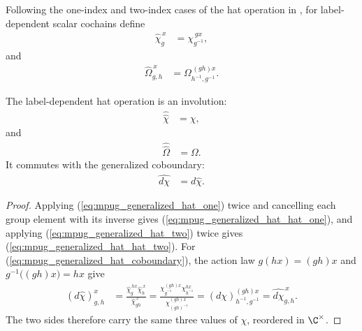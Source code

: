 \begin{definition}
    \label{def:mpug_generalized_hat}
    \leanok
    Following the one-index and two-index cases of the hat operation in
    \cite[line~5912]{FrancoRubio2025MPUGauging}, for label-dependent scalar
    cochains define
    \begin{align}
        \widehat\chi^{\,x}_g
         & =\chi^{\,g x}_{g^{-1}},
        \label{eq:mpug_generalized_hat_one}
    \end{align}
    and
    \begin{align}
        \widehat\Omega^{\,x}_{g,h}
         & =\Omega^{\,(gh)x}_{h^{-1},g^{-1}}.
        \label{eq:mpug_generalized_hat_two}
    \end{align}
\end{definition}

\begin{lemma}
    \label{thm:mpug_generalized_hat_coboundary}
    \leanok
    The label-dependent hat operation is an involution:
    \begin{align}
        \widehat{\widehat\chi} & =\chi,
        \label{eq:mpug_generalized_hat_hat_one}
    \end{align}
    and
    \begin{align}
        \widehat{\widehat\Omega} & =\Omega.
        \label{eq:mpug_generalized_hat_hat_two}
    \end{align}
    It commutes with the generalized coboundary:
    \begin{align}
        \widehat{d\chi} & =d\widehat\chi.
        \label{eq:mpug_generalized_hat_coboundary}
    \end{align}
\end{lemma}

\begin{proof}\leanok
    Applying (\ref{eq:mpug_generalized_hat_one}) twice and cancelling each
    group element with its inverse gives
    (\ref{eq:mpug_generalized_hat_hat_one}), and applying
    (\ref{eq:mpug_generalized_hat_two}) twice gives
    (\ref{eq:mpug_generalized_hat_hat_two}). For
    (\ref{eq:mpug_generalized_hat_coboundary}), the action law
    $g(h x)=(gh)x$ and $g^{-1}\bigl((gh)x\bigr)=h x$ give
    \begin{align}
        (d\widehat\chi)^x_{g,h}
         & =\frac{\widehat\chi^{\,h x}_g\widehat\chi^{\,x}_h}
            {\widehat\chi^{\,x}_{gh}}
        =\frac{\chi^{(gh)x}_{g^{-1}}\chi^{h x}_{h^{-1}}}
         {\chi^{(gh)x}_{(gh)^{-1}}}
        =(d\chi)^{(gh)x}_{h^{-1},g^{-1}}
        =\widehat{d\chi}^{\,x}_{g,h}.
    \end{align}
    The two sides therefore carry the same three values of $\chi$, reordered
    in $\C^\times$.
\end{proof}

